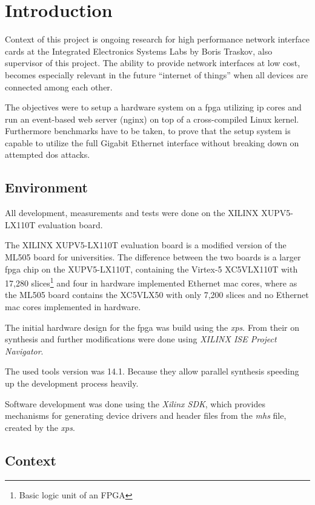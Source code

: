 \chapter{Introduction}

Context of this project is ongoing research for high performance network interface cards at the Integrated Electronics Systems Labs by Boris Traskov, also supervisor of this project. 
The ability to provide network interfaces at low cost, becomes especially relevant in the future "`internet of things"' when all devices are connected among each other.

The objectives were to setup a hardware system on a \gls{fpga} utilizing \gls{ip} cores and run an event-based web server (nginx) on top of a cross-compiled Linux kernel. Furthermore benchmarks have to be taken, to prove that the setup system is capable to utilize the full Gigabit Ethernet interface without breaking down on attempted \gls{dos} attacks.

\section{Environment}

All development, measurements and tests were done on the XILINX XUPV5-LX110T evaluation board.

The XILINX XUPV5-LX110T evaluation board is a modified version of the ML505 board for universities\cite{xupv5manual}. The difference between the two boards is a larger \gls{fpga} chip on the XUPV5-LX110T, containing the Virtex-5 XC5VLX110T with 17,280 slices\footnote{Basic logic unit of an FPGA\cite{fpga_ni}} and four in hardware implemented Ethernet \gls{mac} cores, where as the ML505 board contains the XC5VLX50 with only 7,200 slices and no Ethernet \gls{mac} cores implemented in hardware.

The initial hardware design for the \gls{fpga} was build using the \textit{\gls{xps}}. From their on synthesis and further modifications were done using \textit{XILINX ISE Project Navigator}.

The used tools version was 14.1. Because they allow parallel synthesis speeding up the development process heavily.

Software development was done using the \textit{Xilinx SDK}, which provides mechanisms for generating device drivers and header files from the \textit{\gls{mhs}} file, created by the \textit{\gls{xps}}.

\section{Context}

